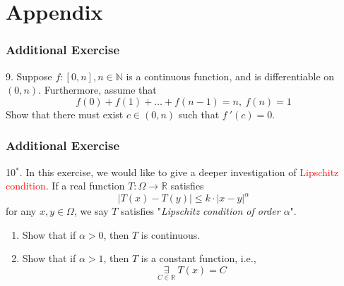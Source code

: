 \documentclass{beamer}
\begin{document}
\section{Appendix}
\begin{frame}
    \frametitle{Additional Exercise}
9. Suppose $f:[0,n],n\in \mathbb{N}$ is a continuous function, and is differentiable on $(0,n)$. Furthermore, assume that 
\begin{equation*}
    f(0)+f(1)+\dots+f(n-1)=n,\ f(n)=1
\end{equation*} 
Show that there must exist $c\in (0,n)$ such that $f~'(c)=0$.

\end{frame}

\begin{frame}
    \frametitle{Additional Exercise}
10$^*$. In this  exercise, we would like to give a deeper investigation of \textcolor{red}{Lipschitz condition}. If a real function $T:\Omega\rightarrow\mathbb{R}$ 
satisfies
\begin{equation*}
    |T(x)-T(y)|\leq k\cdot |x-y|^\alpha
\end{equation*}
for any $x,y\in \Omega$, we say $T$ satisfies "\emph{Lipschitz condition of order $\alpha$}".
\begin{enumerate}
    \item Show that if $\alpha>0$, then $T$ is continuous.
    \item Show that if $\alpha>1$, then $T$ is a constant function, i.e.,
    \begin{equation*}
        \underset{C\in \mathbb{R}}{\exists}\ T(x)=C
    \end{equation*}
\end{enumerate}
    
\end{frame}
\end{document}

